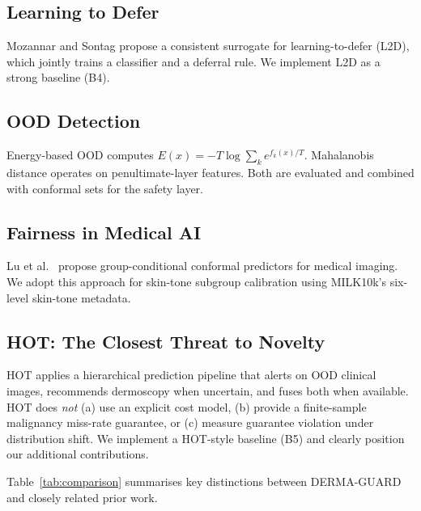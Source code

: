 \documentclass[conference]{IEEEtran}
\newcommand{\1}{\mathbf{1}}
\begin{document}
\subsection{Learning to Defer}

Mozannar and Sontag \cite{mozannar2020defer} propose a consistent surrogate
for learning-to-defer (L2D), which jointly trains a classifier and a
deferral rule. We implement L2D as a strong baseline (B4).

\subsection{OOD Detection}

Energy-based OOD \cite{liu2020energy} computes $E(x)=-T\log\sum_k e^{f_k(x)/T}$.
Mahalanobis distance \cite{lee2018mahalanobis} operates on
penultimate-layer features. Both are evaluated and combined with conformal
sets for the safety layer.

\subsection{Fairness in Medical AI}

Lu et al.\ \cite{lu2021fair} propose group-conditional conformal predictors
for medical imaging. We adopt this approach for skin-tone subgroup
calibration using MILK10k's six-level skin-tone metadata.

\subsection{HOT: The Closest Threat to Novelty}

HOT \cite{mehta2023hot} applies a hierarchical prediction pipeline that
alerts on OOD clinical images, recommends dermoscopy when uncertain, and
fuses both when available. HOT does \emph{not} (a) use an explicit cost
model, (b) provide a finite-sample malignancy miss-rate guarantee, or
(c) measure guarantee violation under distribution shift. We implement a
HOT-style baseline (B5) and clearly position our additional contributions.

\medskip
Table~\ref{tab:comparison} summarises key distinctions between DERMA-GUARD
and closely related prior work.
\end{document}
